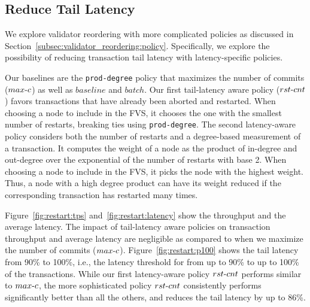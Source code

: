 
\subsection{Reduce Tail Latency}
We explore validator reordering with more complicated policies as discussed in Section~\ref{subsec:validator_reordering:policy}. Specifically, we explore the possibility of reducing transaction tail latency with latency-specific policies.

Our baselines are the \texttt{prod-degree} policy that maximizes the number of commits ($max\hbox{-}c$) as well as $baseline$ and $batch$. 
Our first tail-latency aware policy ($rst\hbox{-}cnt$) favors transactions that have already been aborted and restarted. When choosing a node to include in the FVS, it chooses the one with the smallest number of restarts, breaking ties using \texttt{prod-degree}.
The second latency-aware policy considers both the number of restarts and a
degree-based measurement of a transaction. It computes the weight of a node as
the product of in-degree and out-degree over the exponential of the number of
restarts with base 2. When choosing a node to include in the FVS, it picks the node with the highest weight. Thus, a node with a high degree product can have its weight reduced if the corresponding transaction has restarted many times.

Figure~\ref{fig:restart:tps} and~\ref{fig:restart:latency} show the throughput
and the average latency. The impact of tail-latency aware policies on transaction throughput and average latency are negligible as compared to when we maximize the number of commits ($max\hbox{-}c$).
Figure~\ref{fig:restart:p100} shows the tail latency from 90\% to 100\%, i.e., the latency threshold for from up to 90\% to up to 100\% of the transactions. %
While our first latency-aware policy $rst\hbox{-}cnt$ performs similar to $max\hbox{-}c$, the more sophisticated policy $rst\hbox{-}cnt$ consistently performs significantly better than all the others, and reduces the tail latency by up to 86\%.%

